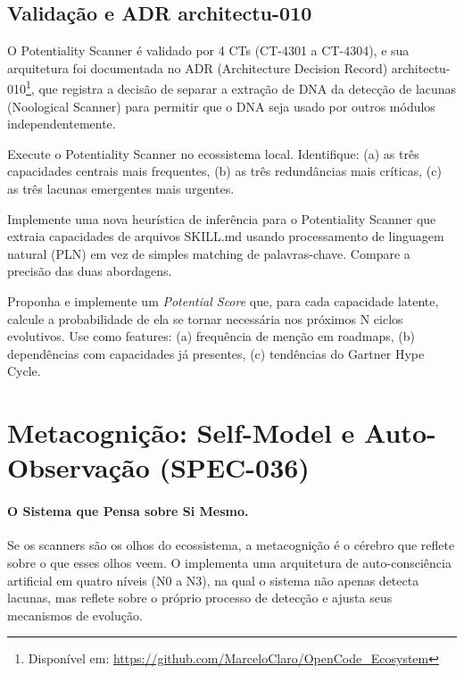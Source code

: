 \subsection{Validação e ADR architectu-010}

O Potentiality Scanner é validado por 4 CTs (CT-4301 a CT-4304), e sua
arquitetura foi documentada no ADR (Architecture Decision Record)
architectu-010\footnote{Disponível em:
\url{https://github.com/MarceloClaro/OpenCode_Ecosystem}},
que registra a decisão de separar a extração de DNA da detecção de lacunas
(Noological Scanner) para permitir que o DNA seja usado por outros módulos
independentemente.

\begin{exercicio}
Execute o Potentiality Scanner no ecossistema local. Identifique: (a) as
três capacidades centrais mais frequentes, (b) as três redundâncias mais
críticas, (c) as três lacunas emergentes mais urgentes.
\end{exercicio}

\begin{exercicio}
Implemente uma nova heurística de inferência para o Potentiality Scanner
que extraia capacidades de arquivos SKILL.md usando processamento de
linguagem natural (PLN) em vez de simples matching de palavras-chave.
Compare a precisão das duas abordagens.
\end{exercicio}

\begin{exercicio}
Proponha e implemente um \emph{Potential Score} que, para cada capacidade
latente, calcule a probabilidade de ela se tornar necessária nos próximos
N ciclos evolutivos. Use como features: (a) frequência de menção em
roadmaps, (b) dependências com capacidades já presentes, (c) tendências
do Gartner Hype Cycle.
\end{exercicio}

\section{Metacognição: Self-Model e Auto-Observação (SPEC-036)}
\label{sec:metacognicao-self-model}
\nivelphd

\paragraph{O Sistema que Pensa sobre Si Mesmo.} Se os scanners são os olhos do ecossistema, a metacognição é o cérebro que reflete sobre o que esses olhos veem. O \opencodeeco{} implementa uma arquitetura de auto-consciência artificial em quatro níveis (N0 a N3), na qual o sistema não apenas detecta lacunas, mas reflete sobre o próprio processo de detecção e ajusta seus mecanismos de evolução.


